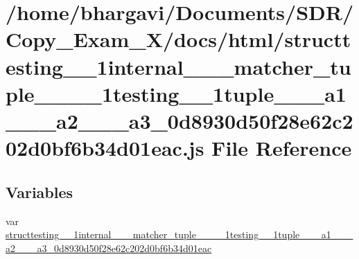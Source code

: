 \hypertarget{structtesting__1__1internal__1__1__matcher__tuple__3__01__1__1testing__1__1tuple__3__01__a1__00_e50dcc3035f742a93c8e05fb21fdf728}{}\section{/home/bhargavi/\+Documents/\+S\+D\+R/\+Copy\+\_\+\+Exam\+\_\+X/docs/html/structtesting\+\_\+\_\+1internal\+\_\+\_\+\_\+matcher\+\_\+tuple\+\_\+\_\+\_\+\_\+1testing\+\_\+\_\+1tuple\+\_\+\_\+\_\+a1\+\_\+\_\+\_\+a2\+\_\+\_\+\_\+a3\+\_\+0d8930d50f28e62c202d0bf6b34d01eac.js File Reference}
\label{structtesting__1__1internal__1__1__matcher__tuple__3__01__1__1testing__1__1tuple__3__01__a1__00_e50dcc3035f742a93c8e05fb21fdf728}
\subsection*{Variables}
\begin{DoxyCompactItemize}
\item 
var \hyperlink{structtesting__1__1internal__1__1__matcher__tuple__3__01__1__1testing__1__1tuple__3__01__a1__00_e50dcc3035f742a93c8e05fb21fdf728_a891ae0eda2397f9d77a8438423e320c0}{structtesting\+\_\+\_\+1internal\+\_\+\_\+\_\+matcher\+\_\+tuple\+\_\+\_\+\_\+\_\+1testing\+\_\+\_\+1tuple\+\_\+\_\+\_\+a1\+\_\+\_\+\_\+a2\+\_\+\_\+\_\+a3\+\_\+0d8930d50f28e62c202d0bf6b34d01eac}
\end{DoxyCompactItemize}


